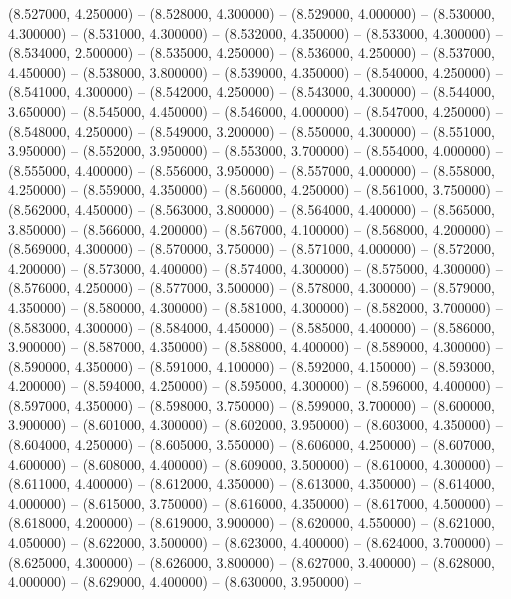 (8.527000, 4.250000) -- 
(8.528000, 4.300000) -- 
(8.529000, 4.000000) -- 
(8.530000, 4.300000) -- 
(8.531000, 4.300000) -- 
(8.532000, 4.350000) -- 
(8.533000, 4.300000) -- 
(8.534000, 2.500000) -- 
(8.535000, 4.250000) -- 
(8.536000, 4.250000) -- 
(8.537000, 4.450000) -- 
(8.538000, 3.800000) -- 
(8.539000, 4.350000) -- 
(8.540000, 4.250000) -- 
(8.541000, 4.300000) -- 
(8.542000, 4.250000) -- 
(8.543000, 4.300000) -- 
(8.544000, 3.650000) -- 
(8.545000, 4.450000) -- 
(8.546000, 4.000000) -- 
(8.547000, 4.250000) -- 
(8.548000, 4.250000) -- 
(8.549000, 3.200000) -- 
(8.550000, 4.300000) -- 
(8.551000, 3.950000) -- 
(8.552000, 3.950000) -- 
(8.553000, 3.700000) -- 
(8.554000, 4.000000) -- 
(8.555000, 4.400000) -- 
(8.556000, 3.950000) -- 
(8.557000, 4.000000) -- 
(8.558000, 4.250000) -- 
(8.559000, 4.350000) -- 
(8.560000, 4.250000) -- 
(8.561000, 3.750000) -- 
(8.562000, 4.450000) -- 
(8.563000, 3.800000) -- 
(8.564000, 4.400000) -- 
(8.565000, 3.850000) -- 
(8.566000, 4.200000) -- 
(8.567000, 4.100000) -- 
(8.568000, 4.200000) -- 
(8.569000, 4.300000) -- 
(8.570000, 3.750000) -- 
(8.571000, 4.000000) -- 
(8.572000, 4.200000) -- 
(8.573000, 4.400000) -- 
(8.574000, 4.300000) -- 
(8.575000, 4.300000) -- 
(8.576000, 4.250000) -- 
(8.577000, 3.500000) -- 
(8.578000, 4.300000) -- 
(8.579000, 4.350000) -- 
(8.580000, 4.300000) -- 
(8.581000, 4.300000) -- 
(8.582000, 3.700000) -- 
(8.583000, 4.300000) -- 
(8.584000, 4.450000) -- 
(8.585000, 4.400000) -- 
(8.586000, 3.900000) -- 
(8.587000, 4.350000) -- 
(8.588000, 4.400000) -- 
(8.589000, 4.300000) -- 
(8.590000, 4.350000) -- 
(8.591000, 4.100000) -- 
(8.592000, 4.150000) -- 
(8.593000, 4.200000) -- 
(8.594000, 4.250000) -- 
(8.595000, 4.300000) -- 
(8.596000, 4.400000) -- 
(8.597000, 4.350000) -- 
(8.598000, 3.750000) -- 
(8.599000, 3.700000) -- 
(8.600000, 3.900000) -- 
(8.601000, 4.300000) -- 
(8.602000, 3.950000) -- 
(8.603000, 4.350000) -- 
(8.604000, 4.250000) -- 
(8.605000, 3.550000) -- 
(8.606000, 4.250000) -- 
(8.607000, 4.600000) -- 
(8.608000, 4.400000) -- 
(8.609000, 3.500000) -- 
(8.610000, 4.300000) -- 
(8.611000, 4.400000) -- 
(8.612000, 4.350000) -- 
(8.613000, 4.350000) -- 
(8.614000, 4.000000) -- 
(8.615000, 3.750000) -- 
(8.616000, 4.350000) -- 
(8.617000, 4.500000) -- 
(8.618000, 4.200000) -- 
(8.619000, 3.900000) -- 
(8.620000, 4.550000) -- 
(8.621000, 4.050000) -- 
(8.622000, 3.500000) -- 
(8.623000, 4.400000) -- 
(8.624000, 3.700000) -- 
(8.625000, 4.300000) -- 
(8.626000, 3.800000) -- 
(8.627000, 3.400000) -- 
(8.628000, 4.000000) -- 
(8.629000, 4.400000) -- 
(8.630000, 3.950000) -- 

